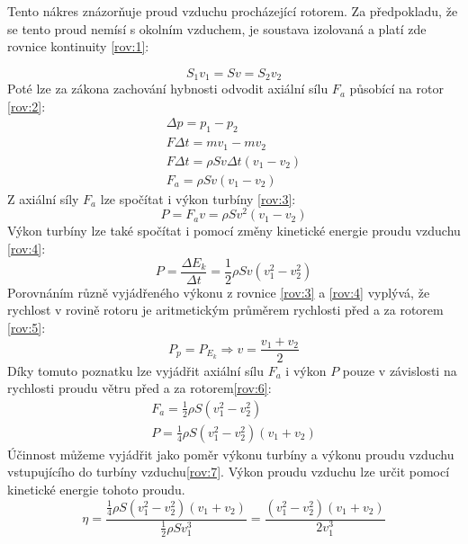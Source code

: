 	Tento nákres znázorňuje proud vzduchu procházející rotorem. Za předpokladu, že se tento proud nemísí s okolním vzduchem, je soustava izolovaná a platí zde rovnice kontinuity \eqref{rov:1}\cite{Rychetnik:Motory}:
	
	\begin{equation}
		S_1 v_1 = Sv = S_2 v_2\label{rov:1}
	\end{equation}
	Poté lze za zákona zachování hybnosti odvodit axiální sílu $F_a$ působící na rotor \eqref{rov:2}\cite{Rychetnik:Motory}:
	\begin{eqnarray}
		\label{rov:2}
		\Delta p = p_1 - p_2 \nonumber \\
		F\Delta t=mv_1 - mv_2 \nonumber \\
		F\Delta t = \rho Sv\Delta t(v_1 - v_2) \nonumber \\
		F_a = \rho Sv(v_1 - v_2)
	\end{eqnarray}
	Z axiální síly $F_a$ lze spočítat i výkon turbíny \eqref{rov:3}\cite{Rychetnik:Motory}:
	\begin{equation}
		\label{rov:3}
		P = F_a v = \rho Sv^2 (v_1 - v_2)
	\end{equation}
	Výkon turbíny lze také spočítat i pomocí změny kinetické energie proudu vzduchu \eqref{rov:4}\cite{Rychetnik:Motory}:
	\begin{equation}
			\label{rov:4}
			P = \frac{\Delta E_k}{\Delta t} = \frac{1}{2} \rho Sv(v_1^2 - v_2^2)
	\end{equation}
	Porovnáním různě vyjádřeného výkonu z rovnice \ref{rov:3} a \ref{rov:4} vyplývá, že rychlost v rovině rotoru je aritmetickým průměrem rychlosti před a za rotorem \eqref{rov:5}\cite{Rychetnik:Motory}:
	\begin{equation}
			\label{rov:5}
			P_p = P_{E_k} \Rightarrow v=\frac{v_1 + v_2}{2}
	\end{equation}
	Díky tomuto poznatku lze vyjádřit axiální sílu $F_a$ i výkon $P$ pouze v závislosti na rychlosti proudu větru před a za rotorem\eqref{rov:6}\cite{Rychetnik:Motory}:
	\begin{eqnarray}
		\label{rov:6}
		F_a = \frac{1}{2}\rho S(v_1^2 - v_2^2) \nonumber \\
		P=\frac{1}{4}\rho S(v_1^2 - v_2^2)(v_1 + v_2)
	\end{eqnarray}
	Účinnost můžeme vyjádřit jako poměr výkonu turbíny a výkonu proudu vzduchu vstupujícího do turbíny vzduchu\eqref{rov:7}\cite{Rychetnik:Motory}. Výkon proudu vzduchu lze určit pomocí kinetické energie tohoto proudu.
	\begin{equation}
		\label{rov:7}
		\eta = \frac{\frac{1}{4}\rho S(v_1^2 - v_2^2)(v_1 + v_2)}{\frac{1}{2}\rho Sv_1^3}=\frac{(v_1^2 - v_2^2)(v_1 + v_2)}{2v_1^3}
	\end{equation}
